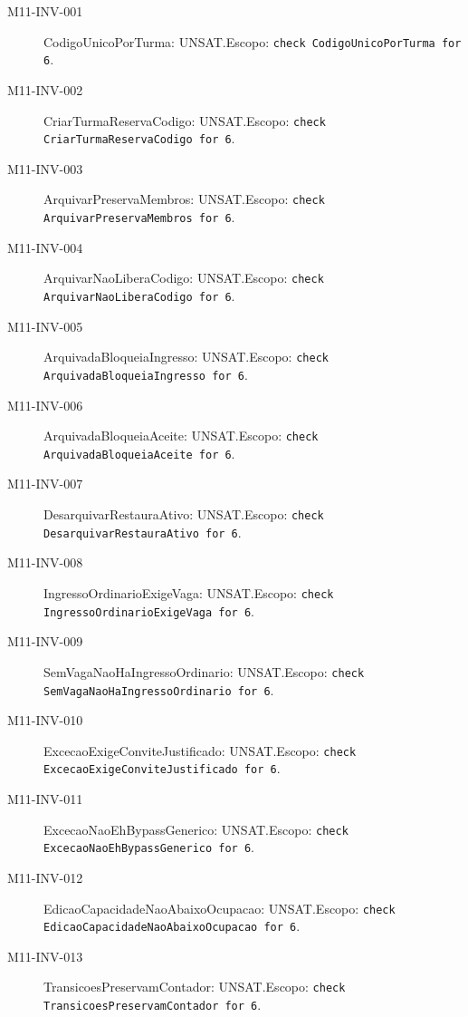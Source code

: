 \begin{description}
\item[M11-INV-001] CodigoUnicoPorTurma: UNSAT.\newline Escopo: \texttt{check CodigoUnicoPorTurma for 6}.
\item[M11-INV-002] CriarTurmaReservaCodigo: UNSAT.\newline Escopo: \texttt{check CriarTurmaReservaCodigo for 6}.
\item[M11-INV-003] ArquivarPreservaMembros: UNSAT.\newline Escopo: \texttt{check ArquivarPreservaMembros for 6}.
\item[M11-INV-004] ArquivarNaoLiberaCodigo: UNSAT.\newline Escopo: \texttt{check ArquivarNaoLiberaCodigo for 6}.
\item[M11-INV-005] ArquivadaBloqueiaIngresso: UNSAT.\newline Escopo: \texttt{check ArquivadaBloqueiaIngresso for 6}.
\item[M11-INV-006] ArquivadaBloqueiaAceite: UNSAT.\newline Escopo: \texttt{check ArquivadaBloqueiaAceite for 6}.
\item[M11-INV-007] DesarquivarRestauraAtivo: UNSAT.\newline Escopo: \texttt{check DesarquivarRestauraAtivo for 6}.
\item[M11-INV-008] IngressoOrdinarioExigeVaga: UNSAT.\newline Escopo: \texttt{check IngressoOrdinarioExigeVaga for 6}.
\item[M11-INV-009] SemVagaNaoHaIngressoOrdinario: UNSAT.\newline Escopo: \texttt{check SemVagaNaoHaIngressoOrdinario for 6}.
\item[M11-INV-010] ExcecaoExigeConviteJustificado: UNSAT.\newline Escopo: \texttt{check ExcecaoExigeConviteJustificado for 6}.
\item[M11-INV-011] ExcecaoNaoEhBypassGenerico: UNSAT.\newline Escopo: \texttt{check ExcecaoNaoEhBypassGenerico for 6}.
\item[M11-INV-012] EdicaoCapacidadeNaoAbaixoOcupacao: UNSAT.\newline Escopo: \texttt{check EdicaoCapacidadeNaoAbaixoOcupacao for 6}.
\item[M11-INV-013] TransicoesPreservamContador: UNSAT.\newline Escopo: \texttt{check TransicoesPreservamContador for 6}.

\end{description}
